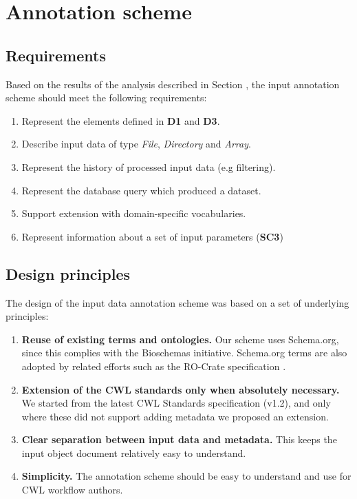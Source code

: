 \section{Annotation scheme}
\label{renske:sup:annotation}


\subsection{Requirements} \label{sec:renske:annot_req}

Based on the results of the analysis described in Section \emph{}, the input annotation scheme should meet the following requirements:

\begin{enumerate}[label=\textbf{IR\arabic*}]
    \item \label{renske:ir:metadata} Represent the elements defined in \textbf{D1} and \textbf{D3}.
    \item \label{renske:ir:types} Describe input data of type \emph{File}, \emph{Directory} and \emph{Array}.
    \item \label{renske:ir:history} Represent the history of processed input data (e.g filtering).
    \item \label{renske:ir:query} Represent the database query which produced a dataset.
    \item \label{renske:ir:extend} Support extension with domain-specific vocabularies.
    \item \label{renske:ir:context} Represent information about a set of input parameters (\textbf{SC3})
\end{enumerate}

\subsection{Design principles}
\label{sec:renske:annot_principles}

The design of the input data annotation scheme was based on a set of underlying principles:

\begin{enumerate}[label=\textbf{IP\arabic*}]
    \item \textbf{Reuse of existing terms and ontologies.} Our scheme uses Schema.org, since this complies with the Bioschemas \cite{gray_bioschemas_2017} initiative. Schema.org terms are also adopted by related efforts such as the RO-Crate specification \cite{SoilandReyes2022a}. \label{renske:pr:bioschemas}
    \item \textbf{Extension of the CWL standards only when absolutely necessary.} We started from the latest CWL Standards specification (v1.2), and only where these did not support adding metadata we proposed an extension. \label{renske:pr:current_standards}
    \item \textbf{Clear separation between input data and metadata.} This keeps the input object document relatively easy to understand. \label{renske:pr:separate}
    \item \textbf{Simplicity.} The annotation scheme should be easy to understand and use for CWL workflow authors. \label{renske:pr:simplicity}
\end{enumerate}

